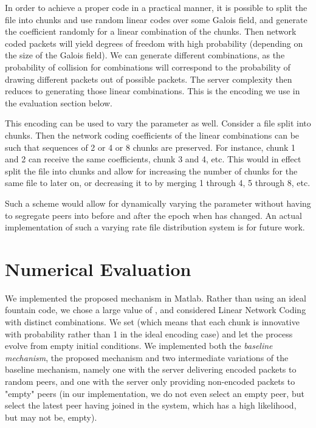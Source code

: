 \documentclass[11pt,conference]{IEEEtran}
\begin{document}
In order to achieve a proper code in a practical manner, it is possible to split the file into  chunks and use random linear codes over some Galois field, and generate the coefficient randomly for a linear combination of the  chunks. Then  network coded packets will yield  degrees of freedom with high probability (depending on the size of the Galois field). We can generate  different combinations, as the probability of collision for  combinations will correspond to the probability of drawing  different packets out of  possible packets. The server complexity then reduces to generating those linear combinations. This is the encoding we use in the evaluation section below.

This encoding can be used to vary the parameter  as well. Consider a file split into  chunks. Then the network coding coefficients of the linear combinations can be such that sequences of 2 or 4 or 8 chunks are preserved. For instance, chunk 1 and 2 can receive the same coefficients, chunk 3 and 4, etc. This would in effect split the file into  chunks and allow for increasing the number of chunks for the same file to  later on, or decreasing it to  by merging 1 through 4, 5 through 8, etc.

Such a scheme would allow for dynamically varying the parameter  without having to segregate peers into before and after the epoch when  has changed. An actual implementation of such a varying rate file distribution system is for future work.




\section{Numerical Evaluation}
\label{sec:num}

We implemented the proposed mechanism in Matlab. Rather than using an ideal fountain code, we chose a large value of , and considered Linear Network Coding with  distinct combinations. We set  (which means that each chunk is innovative with probability  rather than 1 in the ideal encoding case) and let the process evolve from empty initial conditions. We implemented both the {\em baseline mechanism}, the proposed mechanism and two intermediate variations of the baseline mechanism, namely one with the server delivering encoded packets to random peers, and one with the server only providing non-encoded packets to "empty" peers (in our implementation, we do not even select an empty peer, but select the latest peer having joined in the system, which has a high likelihood, but may not be, empty).
\end{document}
